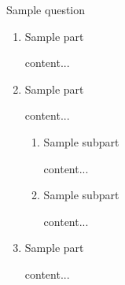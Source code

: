 \documentclass[11pt]{article} %
\begin{document}
	\begin{qstn}[10][][10]
		Sample question
	\begin{enumerate}[label=\protect\circled{\Alph*}]
		\item Sample part
		\begin{soln}
			content...
		\end{soln}
		\item Sample part
		\begin{soln}
			content...
		\end{soln}
		\begin{enumerate}[label=\protect\circled{\roman*}]
			\item Sample subpart
			\begin{soln}
				content...
			\end{soln}
			\item Sample subpart
			\begin{soln}
				content...
			\end{soln}
		\end{enumerate}
		\item Sample part
		\begin{soln}
			content...
		\end{soln}
	\end{enumerate}
	\end{qstn}
\end{document}
